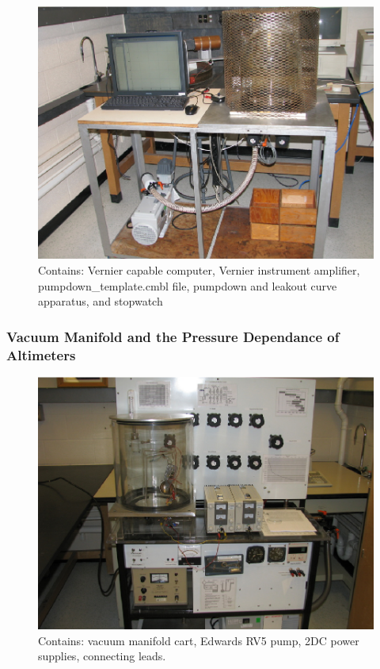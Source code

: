 \documentclass{book}
\begin{document}
\begin{figure}[H]
\includegraphics[scale=0.9]{Pump-Down-Curves}
\caption[align=left]{Contains: Vernier capable computer, Vernier instrument amplifier, pumpdown_template.cmbl file, pumpdown and leakout curve apparatus, and stopwatch}
\end{figure}

\subsubsection{Vacuum Manifold and the Pressure Dependance of Altimeters}

\begin{figure}[H]
\includegraphics[scale=0.9]{Manifold-System}
\caption[align=left]{Contains: vacuum manifold cart, Edwards RV5 pump, 2DC power supplies, connecting leads.}
\end{figure}
\end{document}
